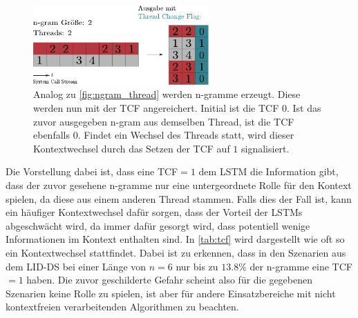                 \begin{figure}[ht]
                    \centering
                    \includegraphics[width=0.6\textwidth]{images/tcf.pdf}
                    \caption{Analog zu \autoref{fig:ngram_thread} werden n-gramme erzeugt.
                             Diese werden nun mit der \ac{TCF} angereichert.
                             Initial ist die \ac{TCF} $0$.
                             Ist das zuvor ausgegeben n-gram aus demselben Thread, ist die \ac{TCF} ebenfalls $0$.
                             Findet ein Wechsel des Threads statt, wird dieser Kontextwechsel durch das Setzen der \ac{TCF} auf $1$ signalisiert.}\label{fig:ngram_tcf}
                \end{figure}

                Die Vorstellung dabei ist, dass eine \ac{TCF}$= 1$ dem \ac{LSTM} die Information gibt, dass der zuvor gesehene n-gramme nur eine untergeordnete Rolle für den Kontext spielen, da diese aus einem anderen Thread stammen.
                Falls dies der Fall ist, kann ein häufiger Kontextwechsel dafür sorgen, dass der Vorteil der \ac{LSTM}s abgeschwächt wird, da immer dafür gesorgt wird, dass potentiell wenige Informationen im Kontext enthalten sind.
                In \autoref{tab:tcf} wird dargestellt wie oft so ein Kontextwechsel stattfindet.
                Dabei ist zu erkennen, dass in den Szenarien aus dem \ac{LID-DS} bei einer Länge von $n=6$ nur bis zu $13.8\%$ der n-gramme eine \ac{TCF}$=1$ haben.
                Die zuvor geschilderte Gefahr scheint also für die gegebenen Szenarien keine Rolle zu spielen, ist aber für andere Einsatzbereiche mit nicht kontextfreien verarbeitenden Algorithmen zu beachten.

